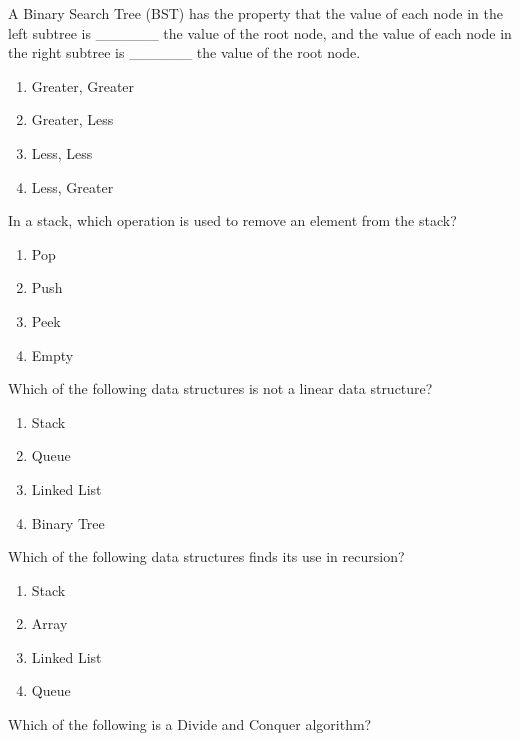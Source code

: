 \documentclass[11pt,a4paper]{article}
\begin{document}
\begin{parts}
  \item A Binary Search Tree (BST) has the property that the value of each node in the left subtree is \_\_\_\_\_\_ the value of the root node, and the value of each node in the right subtree is \_\_\_\_\_\_ the value of the root node.
  
\begin{enumerate}[label=(\alph*),itemsep=2pt]
    \item Greater, Greater
    \item Greater, Less
    \item Less, Less
    \item Less, Greater
  \end{enumerate}
  
  \item In a stack, which operation is used to remove an element from the stack?
  
\begin{enumerate}[label=(\alph*),itemsep=2pt]
    \item Pop
    \item Push
    \item Peek
    \item Empty
  \end{enumerate}
  
  \item Which of the following data structures is not a linear data structure?
  
\begin{enumerate}[label=(\alph*),itemsep=2pt]
    \item Stack
    \item Queue
    \item Linked List
    \item Binary Tree
  \end{enumerate}
  
  \item Which of the following data structures finds its use in recursion?
  
\begin{enumerate}[label=(\alph*),itemsep=2pt]
    \item Stack
    \item Array
    \item Linked List
    \item Queue
  \end{enumerate}
  
  \item Which of the following is a Divide and Conquer algorithm?
  

\end{parts}
\end{document}
